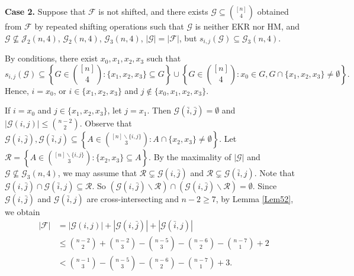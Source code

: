 \documentclass[11pt]{article}
\numberwithin{equation}{section}
\begin{document}
{\bf Case 2.}
 Suppose that $\mathcal{F}$ is not shifted, and there exists $\mathcal{G} \subseteq\binom{[n]}{4}$ obtained from $\mathcal{F}$ by repeated shifting operations such that $\mathcal{G}$  is neither EKR nor HM, and  $\mathcal{G} \nsubseteq \mathcal{J}_2(n, 4)$, $\mathcal{G}_2(n, 4)$, $\mathcal{G}_3(n, 4)$, $|\mathcal{G}|=|\mathcal{F}|$, but
$s_{i, j}(\mathcal{G})\subseteq \mathcal{G}_3(n, 4)$.


By conditions, there exist  $x_0, x_1, x_2, x_3$ such that
$$
s_{i, j}(\mathcal{G})\subseteq \left\{G \in\binom{[n]}{4}: \{x_1,x_2, x_3\} \subseteq G\right\} \cup\left\{G \in\binom{[n]}{4}: x_0 \in G, G \cap \{x_1,x_2, x_3\} \neq \emptyset\right\}.
$$
Hence, $i=x_0$, or $i\in \{x_1, x_2, x_3\}$ and $j \notin \{x_0, x_1, x_2, x_3\}$.


If $i=x_0$ and $j\in \{x_1, x_2, x_3\}$, let $j=x_1$. Then $\mathcal{G}(\bar{i},\bar{j})= \emptyset$ and $|\mathcal{G}(i,j)|\leq \binom{n-2}{2}$. Observe that $\mathcal{G}(i,\bar{j}), \mathcal{G}(\bar{i},j) \subseteq\left\{A \in\binom{[n]\backslash \{i,j\}}{3}:  A\cap \{x_2, x_3\}\neq \emptyset\right\}$. Let
$
\mathcal{R}=\left\{A \in\binom{[n]\backslash \{i,j\}}{3}: \{x_2,x_3\} \subseteq A\right\}.
$
By the maximality of $|\mathcal{G}|$ and $\mathcal{G} \nsubseteq\mathcal{G}_3(n, 4)$, we may assume that $\mathcal{R}\subsetneq \mathcal{G}(i,\bar{j})$ and $\mathcal{R}\subsetneq \mathcal{G}(\bar{i},j)$. Note that $\mathcal{G}(i,\bar{j})\cap \mathcal{G}(\bar{i},j)\subseteq \mathcal{R}$.
So $(\mathcal{G}(i,\bar{j})\backslash\mathcal{R}) \cap(\mathcal{G}(i,\bar{j})\backslash\mathcal{R}) =\emptyset$.
Since $\mathcal{G}(i,\bar{j})$ and $\mathcal{G}(\bar{i},j)$ are 
cross-intersecting and $n-2\geq 7$, by Lemma \ref{Lem52}, we obtain
\begin{align*}
|\mathcal{F}|&=|\mathcal{G}(i,j)|+|\mathcal{G}(i,\bar{j})|+|\mathcal{G}(\bar{i}, j)| \\ 
& \leq \binom{n-2}{2}+ \binom{n-2}{3}-\binom{n-5}{3}-\binom{n-6}{2}-\binom{n-7}{1}+2\\
&<\binom{n-1}{3}-\binom{n-5}{3}-\binom{n-6}{2}-\binom{n-7}{1}+3.
\end{align*}
\end{document}
